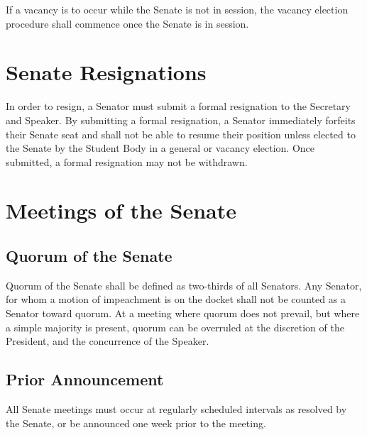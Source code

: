 \documentclass[12pt]{scrreprt}
\begin{document}
If a vacancy is to occur while the Senate is not in session, the vacancy election
procedure shall commence once the Senate is in session.

\section{Senate Resignations}
In order to resign, a Senator must submit a formal resignation to the Secretary and
Speaker. By submitting a formal resignation, a Senator immediately forfeits their Senate seat and shall not be able to resume their position
unless elected to the Senate by the Student Body in a general or vacancy election. Once submitted, a formal resignation may not be withdrawn.
\section{Meetings of the Senate}

\subsection{Quorum of the Senate}
Quorum of the Senate shall be defined as two-thirds of all Senators. Any 
Senator, for whom a motion of impeachment is on the docket shall not be counted as a 
Senator toward quorum. At a meeting where quorum does not prevail, but where a simple majority is present, quorum can be overruled at the discretion of the President, and the 
concurrence of the Speaker. 

\subsection{Prior Announcement}
All Senate meetings must occur at regularly scheduled intervals as
resolved by the Senate, or be announced one week prior to the meeting.
\end{document}
